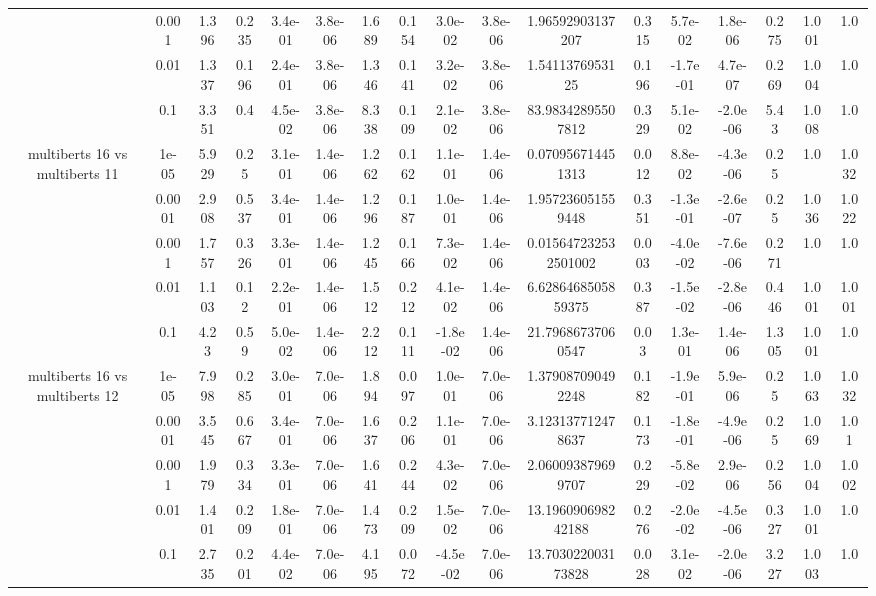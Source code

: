 \begin{tabular}{|c|c|c|c|c|c|c|c|c|c|c|c|c|c|c|c|c|}
 & 0.001 & 1.396 & 0.235 & 3.4e-01 & 3.8e-06 & 1.689 & 0.154 & 3.0e-02 & 3.8e-06 & 1.96592903137207 & 0.315 & 5.7e-02 & 1.8e-06 & 0.275 & 1.001 & 1.0 \\
 & 0.01 & 1.337 & 0.196 & 2.4e-01 & 3.8e-06 & 1.346 & 0.141 & 3.2e-02 & 3.8e-06 & 1.5411376953125 & 0.196 & -1.7e-01 & 4.7e-07 & 0.269 & 1.004 & 1.0 \\
 & 0.1 & 3.351 & 0.4 & 4.5e-02 & 3.8e-06 & 8.338 & 0.109 & 2.1e-02 & 3.8e-06 & 83.98342895507812 & 0.329 & 5.1e-02 & -2.0e-06 & 5.43 & 1.008 & 1.0 \\
\hline
\multirow{5}{*}{multiberts 16 vs multiberts 11} & 1e-05 & 5.929 & 0.25 & 3.1e-01 & 1.4e-06 & 1.262 & 0.162 & 1.1e-01 & 1.4e-06 & 0.070956714451313 & 0.012 & 8.8e-02 & -4.3e-06 & 0.25 & 1.0 & 1.032 \\
 & 0.0001 & 2.908 & 0.537 & 3.4e-01 & 1.4e-06 & 1.296 & 0.187 & 1.0e-01 & 1.4e-06 & 1.957236051559448 & 0.351 & -1.3e-01 & -2.6e-07 & 0.25 & 1.036 & 1.022 \\
 & 0.001 & 1.757 & 0.326 & 3.3e-01 & 1.4e-06 & 1.245 & 0.166 & 7.3e-02 & 1.4e-06 & 0.015647232532501002 & 0.003 & -4.0e-02 & -7.6e-06 & 0.271 & 1.0 & 1.0 \\
 & 0.01 & 1.103 & 0.12 & 2.2e-01 & 1.4e-06 & 1.512 & 0.212 & 4.1e-02 & 1.4e-06 & 6.6286468505859375 & 0.387 & -1.5e-02 & -2.8e-06 & 0.446 & 1.001 & 1.001 \\
 & 0.1 & 4.23 & 0.59 & 5.0e-02 & 1.4e-06 & 2.212 & 0.111 & -1.8e-02 & 1.4e-06 & 21.79686737060547 & 0.03 & 1.3e-01 & 1.4e-06 & 1.305 & 1.001 & 1.0 \\
\hline
\multirow{5}{*}{multiberts 16 vs multiberts 12} & 1e-05 & 7.998 & 0.285 & 3.0e-01 & 7.0e-06 & 1.894 & 0.097 & 1.0e-01 & 7.0e-06 & 1.379087090492248 & 0.182 & -1.9e-01 & 5.9e-06 & 0.25 & 1.063 & 1.032 \\
 & 0.0001 & 3.545 & 0.667 & 3.4e-01 & 7.0e-06 & 1.637 & 0.206 & 1.1e-01 & 7.0e-06 & 3.123137712478637 & 0.173 & -1.8e-01 & -4.9e-06 & 0.25 & 1.069 & 1.01 \\
 & 0.001 & 1.979 & 0.334 & 3.3e-01 & 7.0e-06 & 1.641 & 0.244 & 4.3e-02 & 7.0e-06 & 2.060093879699707 & 0.229 & -5.8e-02 & 2.9e-06 & 0.256 & 1.004 & 1.002 \\
 & 0.01 & 1.401 & 0.209 & 1.8e-01 & 7.0e-06 & 1.473 & 0.209 & 1.5e-02 & 7.0e-06 & 13.196090698242188 & 0.276 & -2.0e-02 & -4.5e-06 & 0.327 & 1.001 & 1.0 \\
 & 0.1 & 2.735 & 0.201 & 4.4e-02 & 7.0e-06 & 4.195 & 0.072 & -4.5e-02 & 7.0e-06 & 13.703022003173828 & 0.028 & 3.1e-02 & -2.0e-06 & 3.227 & 1.003 & 1.0 \\

\end{tabular}
